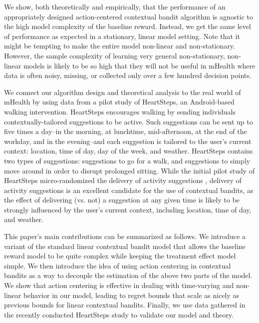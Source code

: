 We show, both theoretically and empirically, that the performance of an appropriately designed action-centered contextual bandit algorithm is agnostic to the high model complexity of the baseline reward. Instead, we get the same level of performance as expected in a stationary, linear model setting. Note that it might be tempting to make the entire model non-linear and non-stationary. However, the sample complexity of learning very general non-stationary, non-linear models is likely to be so high that they will not be useful in mHealth where data is often noisy, missing, or collected only over a few hundred decision points.

We connect our algorithm design and theoretical analysis to the real world of mHealth by using data from a pilot study of HeartSteps, an Android-based walking intervention. HeartSteps encourages walking by sending individuals contextually-tailored suggestions to be active. Such suggestions can be sent up to five times a day--in the morning, at lunchtime, mid-afternoon, at the end of the workday, and in the evening--and each suggestion is tailored to the user's current context: location, time of day, day of the week, and weather. HeartSteps contains two types of suggestions: suggestions to go for a walk, and suggestions to simply move around in order to disrupt prolonged sitting. 
While the initial pilot study of HeartSteps micro-randomized the delivery of activity suggestions \citep{klasnja2015microrandomized,liao2015sample}, delivery of activity suggestions is an excellent candidate for the use of contextual bandits, as the effect of delivering (vs. not) a suggestion at any given time is likely to be strongly influenced by the user's current context, including location, time of day, and weather. 

This paper's main contributions can be summarized as follows.
We introduce a variant of the standard linear contextual bandit model that allows the baseline reward model to be quite complex while keeping the treatment effect model simple.
We then introduce the idea of using action centering in contextual bandits as a way to decouple the estimation of the above two parts of the model.
We show that action centering is effective in dealing with time-varying and non-linear behavior in our model, leading to regret bounds that scale as nicely as previous bounds for linear contextual bandits.
Finally, we use data gathered in the recently conducted HeartSteps study to validate our model and theory. %



